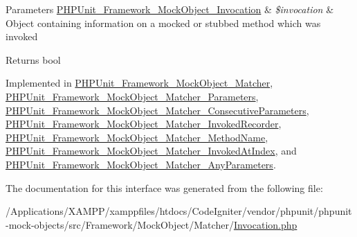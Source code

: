 \begin{DoxyParams}[1]{Parameters}
\mbox{\hyperlink{interface_p_h_p_unit___framework___mock_object___invocation}{P\+H\+P\+Unit\+\_\+\+Framework\+\_\+\+Mock\+Object\+\_\+\+Invocation}} & {\em \$invocation} & Object containing information on a mocked or stubbed method which was invoked\\
\hline
\end{DoxyParams}
\begin{DoxyReturn}{Returns}
bool 
\end{DoxyReturn}


Implemented in \mbox{\hyperlink{class_p_h_p_unit___framework___mock_object___matcher_a4988c6fa11e275302172d0a4ae32dd3a}{P\+H\+P\+Unit\+\_\+\+Framework\+\_\+\+Mock\+Object\+\_\+\+Matcher}}, \mbox{\hyperlink{class_p_h_p_unit___framework___mock_object___matcher___parameters_a4988c6fa11e275302172d0a4ae32dd3a}{P\+H\+P\+Unit\+\_\+\+Framework\+\_\+\+Mock\+Object\+\_\+\+Matcher\+\_\+\+Parameters}}, \mbox{\hyperlink{class_p_h_p_unit___framework___mock_object___matcher___consecutive_parameters_a4988c6fa11e275302172d0a4ae32dd3a}{P\+H\+P\+Unit\+\_\+\+Framework\+\_\+\+Mock\+Object\+\_\+\+Matcher\+\_\+\+Consecutive\+Parameters}}, \mbox{\hyperlink{class_p_h_p_unit___framework___mock_object___matcher___invoked_recorder_a4988c6fa11e275302172d0a4ae32dd3a}{P\+H\+P\+Unit\+\_\+\+Framework\+\_\+\+Mock\+Object\+\_\+\+Matcher\+\_\+\+Invoked\+Recorder}}, \mbox{\hyperlink{class_p_h_p_unit___framework___mock_object___matcher___method_name_a4988c6fa11e275302172d0a4ae32dd3a}{P\+H\+P\+Unit\+\_\+\+Framework\+\_\+\+Mock\+Object\+\_\+\+Matcher\+\_\+\+Method\+Name}}, \mbox{\hyperlink{class_p_h_p_unit___framework___mock_object___matcher___invoked_at_index_a4988c6fa11e275302172d0a4ae32dd3a}{P\+H\+P\+Unit\+\_\+\+Framework\+\_\+\+Mock\+Object\+\_\+\+Matcher\+\_\+\+Invoked\+At\+Index}}, and \mbox{\hyperlink{class_p_h_p_unit___framework___mock_object___matcher___any_parameters_a4988c6fa11e275302172d0a4ae32dd3a}{P\+H\+P\+Unit\+\_\+\+Framework\+\_\+\+Mock\+Object\+\_\+\+Matcher\+\_\+\+Any\+Parameters}}.



The documentation for this interface was generated from the following file\+:\begin{DoxyCompactItemize}
\item 
/\+Applications/\+X\+A\+M\+P\+P/xamppfiles/htdocs/\+Code\+Igniter/vendor/phpunit/phpunit-\/mock-\/objects/src/\+Framework/\+Mock\+Object/\+Matcher/\mbox{\hyperlink{_matcher_2_invocation_8php}{Invocation.\+php}}\end{DoxyCompactItemize}
